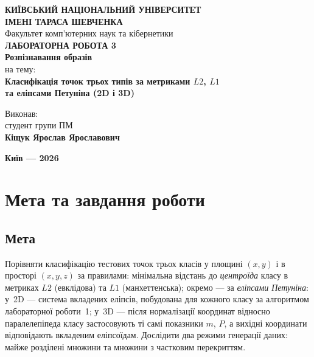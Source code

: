 \documentclass[14pt,a4paper,oneside]{extarticle}
\begin{document}
\begin{titlepage}
\thispagestyle{empty}
\begin{center}
{\Large \textbf{КИЇВСЬКИЙ НАЦІОНАЛЬНИЙ УНІВЕРСИТЕТ\\
ІМЕНІ ТАРАСА ШЕВЧЕНКА}}\\[2\baselineskip]
{\large Факультет комп'ютерних наук та кібернетики}\\[3\baselineskip]
{\Large \textbf{ЛАБОРАТОРНА РОБОТА 3}}\\[0.75\baselineskip]
{\large \textbf{Розпізнавання образів}}\\[2.5\baselineskip]
{\normalsize на тему:}\\[0.75\baselineskip]
{\large \textbf{Класифікація точок трьох типів за метриками $L2$, $L1$\\
та еліпсами Петуніна (2D і 3D)}}\\[4\baselineskip]
\end{center}
\begin{flushright}
Виконав:\\[0.25\baselineskip]
студент групи ПМ\\[0.4\baselineskip]
{\Large \textbf{Кіщук Ярослав Ярославович}}\\[2\baselineskip]
\end{flushright}
\vfill
\begin{center}
{\large \textbf{Київ --- 2026}}
\end{center}
\end{titlepage}
\clearpage

\tableofcontents
\clearpage

\section{Мета та завдання роботи}

\subsection{Мета}
Порівняти класифікацію тестових точок трьох класів у площині $(x,y)$ і в просторі $(x,y,z)$ за правилами:
мінімальна відстань до \emph{центроїда} класу в метриках $L2$ (евклідова) та $L1$ (манхеттенська);
окремо --- за \emph{еліпсами Петуніна}: у~2D --- система вкладених еліпсів, побудована для кожного класу за алгоритмом лабораторної роботи~1; у~3D --- після нормалізації координат відносно паралелепіпеда класу застосовують ті самі показники $m$, $P$, а вихідні координати відповідають вкладеним еліпсоїдам.
Дослідити два режими генерації даних: майже розділені множини та множини з частковим перекриттям.
\end{document}
